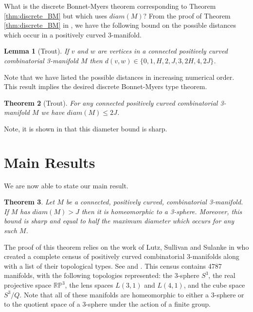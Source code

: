 \documentclass[12pt]{article}
\theoremstyle{plain}
\newtheorem{theorem}{Theorem}
\newtheorem{lemma}[theorem]{Lemma}
\theoremstyle{definition}
\theoremstyle{remark}
\begin{document}
What is the discrete Bonnet-Myers theorem corresponding to Theorem \ref{thm:discrete_BM} but which uses $diam(M)$? From the proof of Theorem \ref{thm:discrete_BM} in \cite{Trout10}, we have the following bound on the possible distances which occur in a positively curved 3-manifold.

\begin{lemma}[Trout] If $v$ and $w$ are vertices in a connected positively curved combinatorial 3-manifold $M$ then $d(v,w) \in \{0, 1, H, 2, J, 3, 2H, 4, 2J \}$.
\end{lemma}

\noindent Note that we have listed the possible distances in increasing numerical order. This result implies the desired discrete Bonnet-Myers type theorem.

\begin{theorem}[Trout] For any connected positively curved combinatorial 3-manifold $M$ we have $diam(M) \leq 2J$.
\label{thm:discrete_BM_expanded_paths}
\end{theorem}

\noindent Note, it is shown in \cite{Trout10} that this diameter bound is sharp.

\section{Main Results}

We are now able to state our main result.

\begin{theorem} Let $M$ be a connected, positively curved, combinatorial 3-manifold. If $M$ has $diam(M)>J$ then it is homeomorphic to a 3-sphere. Moreover, this bound is sharp and equal to half the maximum diameter which occurs for any such $M$.
\label{thm:discrete_GS}
\end{theorem}

\noindent The proof of this theorem relies on the work of Lutz, Sullivan and Sulanke in \cite{Lutz07, LutzSul_unpub, sulanke2009isomorphism} who created a complete census of positively curved combinatorial 3-manifolds along with a list of their topological types. See \cite{Lutz_online_manifolds} and \cite{Lutz_online_topological_types}. This census contains 4787 manifolds, with the following topologies represented: the 3-sphere $S^3$, the real projective space $\mathbb{RP}^3$, the lens spaces $L(3,1)$ and $L(4,1)$, and the cube space $S^3/Q$. Note that all of these manifolds are homeomorphic to either a 3-sphere or to the quotient space of a 3-sphere under the action of a finite group. 
\end{document}

